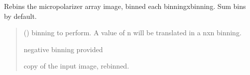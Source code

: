 \documentclass[letterpaper,10pt,english]{sphinxmanual}
\begin{document}
\begin{fulllineitems}

\begin{fulllineitems}
\label{\detokenize{micropolarray:micropolarray.micropol_image.MicropolImage.polparam_list}}
\pysigstartsignatures
{}
\pysigstopsignatures
\end{fulllineitems}


\begin{fulllineitems}
\label{\detokenize{micropolarray:micropolarray.micropol_image.MicropolImage.rebin}}
\pysigstartsignatures
{}
\pysigstopsignatures
\sphinxAtStartPar
Rebins the micropolarizer array image, binned each
binningxbinning. Sum bins by default.
\begin{quote}\begin{description}
\sphinxAtStartPar
{} () \textendash{} binning to perform. A value of n will be translated in a nxn binning.

\sphinxAtStartPar
{} \textendash{} negative binning provided

\sphinxAtStartPar
copy of the input image, rebinned.

\sphinxAtStartPar
{\hyperref[\detokenize{micropolarray:micropolarray.micropol_image.MicropolImage}]{}}

\end{description}\end{quote}

\end{fulllineitems}


\end{fulllineitems}
\end{document}
